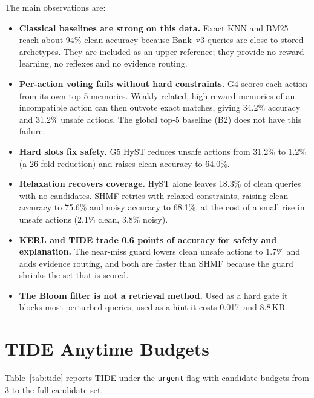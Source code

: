 \documentclass[12pt,a4paper,oneside]{report}
\newcommand{\code}[1]{\texttt{\small #1}}
\newcommand{\ms}{\,\text{ms}}
\begin{document}
\noindent The main observations are:
\begin{itemize}
  \item \textbf{Classical baselines are strong on this data.} Exact KNN and BM25 reach about 94\% clean accuracy because Bank~v3 queries are close to stored archetypes. They are included as an upper reference; they provide no reward learning, no reflexes and no evidence routing.
  \item \textbf{Per-action voting fails without hard constraints.} G4 scores each action from its own top-5 memories. Weakly related, high-reward memories of an incompatible action can then outvote exact matches, giving 34.2\% accuracy and 31.2\% unsafe actions. The global top-5 baseline (B2) does not have this failure.
  \item \textbf{Hard slots fix safety.} G5 HyST reduces unsafe actions from 31.2\% to 1.2\% (a 26-fold reduction) and raises clean accuracy to 64.0\%.
  \item \textbf{Relaxation recovers coverage.} HyST alone leaves 18.3\% of clean queries with no candidates. SHMF retries with relaxed constraints, raising clean accuracy to 75.6\% and noisy accuracy to 68.1\%, at the cost of a small rise in unsafe actions (2.1\% clean, 3.8\% noisy).
  \item \textbf{KERL and TIDE trade 0.6 points of accuracy for safety and explanation.} The near-miss guard lowers clean unsafe actions to 1.7\% and adds evidence routing, and both are faster than SHMF because the guard shrinks the set that is scored.
  \item \textbf{The Bloom filter is not a retrieval method.} Used as a hard gate it blocks most perturbed queries; used as a hint it costs 0.017\ms{} and 8.8\,KB.
\end{itemize}

\section{TIDE Anytime Budgets}
Table~\ref{tab:tide} reports TIDE under the \code{urgent} flag with candidate budgets from 3 to the full candidate set.
\end{document}
